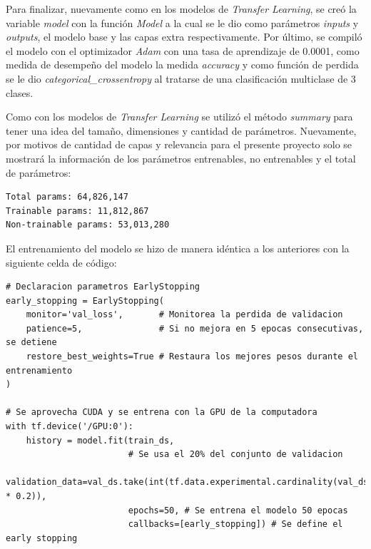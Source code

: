 Para finalizar, nuevamente como en los modelos de \textit{Transfer Learning}, se creó la variable \textit{model} con la función \textit{Model} a la cual se le dio como parámetros \textit{inputs} y \textit{outputs}, el modelo base y las capas extra respectivamente. Por último, se compiló el modelo con el optimizador \textit{Adam} con una tasa de aprendizaje de 0.0001, como medida de desempeño del modelo la medida \textit{accuracy} y como función de perdida se le dio \textit{categorical\_crossentropy} al tratarse de una clasificación multiclase de 3 clases.

Como con los modelos de \textit{Transfer Learning} se utilizó el método \textit{summary} para tener una idea del tamaño, dimensiones y cantidad de parámetros. Nuevamente, por motivos de cantidad de capas y relevancia para el presente proyecto solo se mostrará la información de los parámetros entrenables, no entrenables y el total de parámetros: \\


\begin{lstlisting}[caption={Salida del método summary aplicado a la red de \textit{Fine Tuning} con \textit{ResNetRS101}}]
Total params: 64,826,147
Trainable params: 11,812,867
Non-trainable params: 53,013,280
\end{lstlisting}

El entrenamiento del modelo se hizo de manera idéntica a los anteriores con la siguiente celda de código: \\


\begin{lstlisting}[caption={Código entrenamiento de la CNN con \textit{Fine Tuning}}]
# Declaracion parametros EarlyStopping
early_stopping = EarlyStopping(
    monitor='val_loss',       # Monitorea la perdida de validacion
    patience=5,               # Si no mejora en 5 epocas consecutivas, se detiene
    restore_best_weights=True # Restaura los mejores pesos durante el entrenamiento
)

# Se aprovecha CUDA y se entrena con la GPU de la computadora
with tf.device('/GPU:0'):
    history = model.fit(train_ds, 
                        # Se usa el 20% del conjunto de validacion
                        validation_data=val_ds.take(int(tf.data.experimental.cardinality(val_ds).numpy() * 0.2)), 
                        epochs=50, # Se entrena el modelo 50 epocas
                        callbacks=[early_stopping]) # Se define el early stopping
\end{lstlisting}
